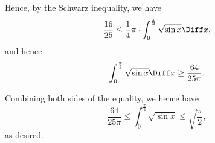 \begin{enumerate}
          Hence, by the Schwarz inequality, we have
          \begin{align*}
              \frac{16}{25} \leq \frac{1}{4} \pi \cdot \int_{0}^{\frac{\pi}{2}} \sqrt{\sin x} \Diff x,
          \end{align*}
          and hence
          \[
              \int_{0}^{\frac{\pi}{2}} \sqrt{\sin x} \Diff x \geq \frac{64}{25\pi}.
          \]

          Combining both sides of the equality, we hence have
          \[
              \frac{64}{25 \pi} \leq \int_{0}^{\frac{\pi}{2}} \sqrt{\sin x} \leq \sqrt{\frac{\pi}{2}},
          \]
          as desired.
\end{enumerate}